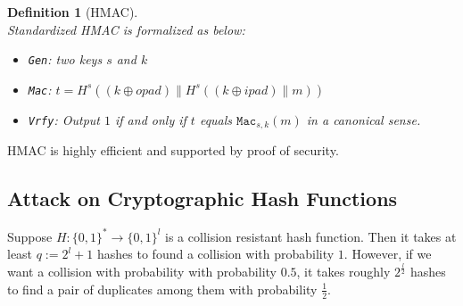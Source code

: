\documentclass[12pt]{article}
\newtheorem{definition}{Definition}[section]
\theoremstyle{definition}
\begin{document}
\begin{definition}[HMAC]
\hfill\\\normalfont Standardized HMAC is formalized as below:
\begin{itemize}
\item \texttt{Gen}: two keys $s$ and $k$
\item \texttt{Mac}: $t=H^s((k\oplus opad) \| H^s((k\oplus ipad)\| m))$
\item \texttt{Vrfy}: Output $1$ if and only if $t$ equals $\texttt{Mac}_{s,k}(m)$ in a canonical sense.
\end{itemize}
\end{definition}
HMAC is highly efficient and supported by proof of security. 
\subsection{Attack on Cryptographic Hash Functions}
Suppose $H:\{0,1\}^\ast \to \{0,1\}^l$ is a collision resistant hash function. Then it takes at least $q:=2^l+1$ hashes to found a collision with probability $1$. However, if we want a collision with probability with probability $0.5$, it takes roughly $2^{\frac{l}{2}}$ hashes to find a pair of duplicates among them with probability $\frac{1}{2}$.
\end{document}

